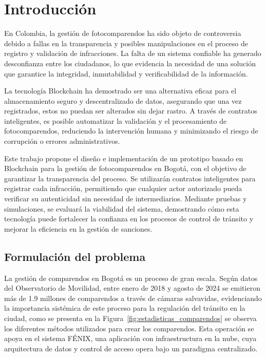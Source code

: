 \section{\large Introducción}
En Colombia, la gestión de fotocomparendos ha sido objeto de controversia debido a fallas en la transparencia y posibles manipulaciones en el proceso de registro y validación de infracciones. La falta de un sistema confiable ha generado desconfianza entre los ciudadanos, lo que evidencia la necesidad de una solución que garantice la integridad, inmutabilidad y verificabilidad de la información.

La tecnología Blockchain ha demostrado ser una alternativa eficaz para el almacenamiento seguro y descentralizado de datos, asegurando que una vez registrados, estos no puedan ser alterados sin dejar rastro. A través de contratos inteligentes, es posible automatizar la validación y el procesamiento de fotocomparendos, reduciendo la intervención humana y minimizando el riesgo de corrupción o errores administrativos.

Este trabajo propone el diseño e implementación de un prototipo basado en Blockchain para la gestión de fotocomparendos en Bogotá, con el objetivo de garantizar la transparencia del proceso. Se utilizarán contratos inteligentes para registrar cada infracción, permitiendo que cualquier actor autorizado pueda verificar su autenticidad sin necesidad de intermediarios. Mediante pruebas y simulaciones, se evaluará la viabilidad del sistema, demostrando cómo esta tecnología puede fortalecer la confianza en los procesos de control de tránsito y mejorar la eficiencia en la gestión de sanciones.

\subsection{Formulación del problema}
La gestión de comparendos en Bogotá es un proceso de gran escala. Según datos del Observatorio de Movilidad, entre enero de 2018 y agosto de 2024 se emitieron más de 1.9 millones de comparendos a través de cámaras salvavidas, evidenciando la importancia sistémica de este proceso para la regulación del tránsito en la ciudad, como se presenta en la Figura~\ref{fig:estadisticas_comparendos} se observa los diferentes métodos utilizados para crear los comparendos. Esta operación se apoya en el sistema FÉNIX, una aplicación con infraestructura en la nube, cuya arquitectura de datos y control de acceso opera bajo un paradigma centralizado.

